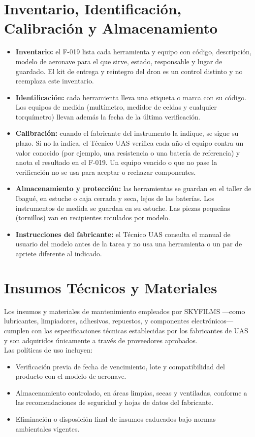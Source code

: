 \section{Inventario, Identificación, Calibración y Almacenamiento}
\begin{itemize}
    \item \textbf{Inventario:} el F-019 lista cada herramienta y equipo con código, descripción, modelo de aeronave para el que sirve, estado, responsable y lugar de guardado. El kit de entrega y reintegro del dron es un control distinto y no reemplaza este inventario.
    \item \textbf{Identificación:} cada herramienta lleva una etiqueta o marca con su código. Los equipos de medida (multímetro, medidor de celdas y cualquier torquímetro) llevan además la fecha de la última verificación.
    \item \textbf{Calibración:} cuando el fabricante del instrumento la indique, se sigue su plazo. Si no la indica, el Técnico UAS verifica cada año el equipo contra un valor conocido (por ejemplo, una resistencia o una batería de referencia) y anota el resultado en el F-019. Un equipo vencido o que no pase la verificación no se usa para aceptar o rechazar componentes.
    \item \textbf{Almacenamiento y protección:} las herramientas se guardan en el taller de Ibagué, en estuche o caja cerrada y seca, lejos de las baterías. Los instrumentos de medida se guardan en su estuche. Las piezas pequeñas (tornillos) van en recipientes rotulados por modelo.
    \item \textbf{Instrucciones del fabricante:} el Técnico UAS consulta el manual de usuario del modelo antes de la tarea y no usa una herramienta o un par de apriete diferente al indicado.
\end{itemize}

\section{Insumos Técnicos y Materiales}
Los insumos y materiales de mantenimiento empleados por SKYFILMS —como lubricantes, limpiadores, adhesivos, repuestos, y componentes electrónicos— cumplen con las especificaciones técnicas establecidas por los fabricantes de UAS y son adquiridos únicamente a través de proveedores aprobados.\\

Las políticas de uso incluyen:

\begin{itemize}
    \item Verificación previa de fecha de vencimiento, lote y compatibilidad del producto con el modelo de aeronave.

    \item Almacenamiento controlado, en áreas limpias, secas y ventiladas, conforme a las recomendaciones de seguridad y hojas de datos del fabricante.

    \item Eliminación o disposición final de insumos caducados bajo normas ambientales vigentes.
\end{itemize}


